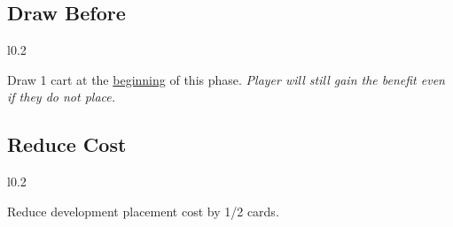 \documentclass[letterpaper,landscape,twocolumn,8pt]{extarticle}
\begin{document}
\begin{minipage}[t]{\calc{1/3}\columnwidth}
\subsection*{Draw Before}

\setlength{\intextsep}{0pt}%

\begin{wrapfigure}{l}{0.2\columnwidth}
    
\end{wrapfigure}

Draw 1 cart at the \underline{beginning} of this phase.
\medbreak{}
\textit{Player will still gain the benefit even if they do not place.}

\end{minipage}
\begin{minipage}[t]{0.3\columnwidth}
\subsection*{Reduce Cost}

\setlength{\intextsep}{0pt}%

\begin{wrapfigure}{l}{0.2\columnwidth}
    

    
\end{wrapfigure}

Reduce development placement cost by 1/2 cards.

\end{minipage}
\end{document}
